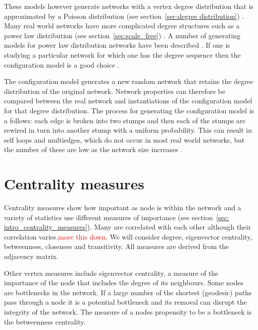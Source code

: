These models however generate networks with a vertex degree distribution that is approximated by  a Poisson distribution (see section~\ref{sec:degree distribution}) . Many real world networks have more complicated degree structures such as a power law distribution (see section~\ref{sec:scale_free}) . A number of generating models for power law distribution networks have been described . If one is studying a particular network for which one has the degree sequence then the configuration model is a good choice . \cite{newman2018networks}

The configuration model generates a new random network that retains the degree distribution of the original network. Network properties can therefore be compared between the real network and instantiations of the configuration model for that degree distribution. The process for generating the configuration model is a follows: each edge is broken into two stumps and then each of the stumps are rewired in turn into another stump with a uniform probability. This can result in self loops and multiedges, which do not occur in most real world networks, but the number of these are low as the network size increases \cite{newman2018networks}.




\section{Centrality measures}
Centrality measures show how important as node is within the network  and a variety of statistics use different measures of importance (see section~\ref{sec: intro_centrality_measures}). Many are correlated with each other although their correlation varies.\textcolor{red}{move this down}. We will consider degree, eigenvector centrality, betweenness, closeness and transitivity. All measures are derived from the adjacency matrix.



Other vertex measures include eigenvector centrality, a measure of the importance of the node that includes the degree of its neighbours. \cite{bonacich1987power}  Some nodes are bottlenecks in the network. If a large number of the shortest (geodesic) paths pass through a node it is a potential bottleneck and its removal can disrupt the integrity of the network. The measure of a nodes propensity to be a bottleneck is the betweenness centrality. \cite{freeman1977set} 

